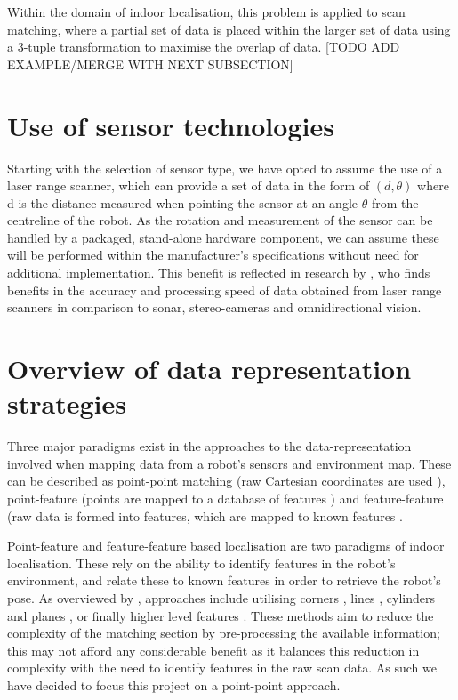 \documentclass[authoryearcitations]{UoYCSproject}
\begin{document}
Within the domain of indoor localisation, this problem is applied to scan matching, where a partial set of data is placed within the larger set of data using a 3-tuple transformation to maximise the overlap of data. [TODO ADD EXAMPLE/MERGE WITH NEXT SUBSECTION]


\section{Use of sensor technologies}
Starting with the selection of sensor type, we have opted to assume the use of a laser range scanner, which can provide a set of data in the form of $(d, \theta)$ where d is the distance measured when pointing the sensor at an angle $\theta$ from the centreline of the robot. As the rotation and measurement of the sensor can be handled by a packaged, stand-alone hardware component, we can assume these will be performed within the manufacturer's specifications without need for additional implementation. This benefit is reflected in research by \citet{Lingemann2005-hm}, who finds benefits in the accuracy and processing speed of data obtained from laser range scanners in comparison to sonar, stereo-cameras and omnidirectional vision.

\section{Overview of data representation strategies}
Three major paradigms exist in the approaches to the data-representation involved when mapping data from a robot's sensors and environment map. These can be described as point-point matching (raw Cartesian coordinates are used \cite{Lu1997-zv}), point-feature (points are mapped to a database of features \cite{Censi2008-ik}) and feature-feature (raw data is formed into features, which are mapped to known features \cite{Reina2000-vq}. 

Point-feature and feature-feature based localisation are two paradigms of indoor localisation. These rely on the ability to identify features in the robot's environment, and relate these to known features in order to retrieve the robot's pose. As overviewed by \citet{Filliat2003-ay}, approaches include utilising corners \cite{Borghi1995-pi} \cite{Hebert1996-rc}, lines \cite{Moutarlier1990-ld} \cite{Einsele1997-dl}, cylinders and planes \cite{Leonard1990-hx}, or finally higher level features \cite{Ayache1990-ok}. These methods aim to reduce the complexity of the matching section by pre-processing the available information; this may not afford any considerable benefit as it balances this reduction in complexity with the need to identify features in the raw scan data. As such we have decided to focus this project on a point-point approach.
\end{document}
